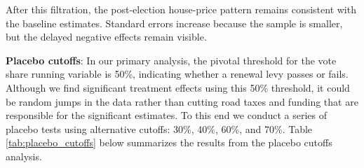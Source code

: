 After this filtration, the post-election house-price pattern remains consistent with the baseline estimates. Standard errors increase because the sample is smaller, but the delayed negative effects remain visible.

\textbf{Placebo cutoffs}: In our primary analysis, the pivotal threshold for the vote share running variable is 50\%, indicating whether a renewal levy passes or fails.  Although we find significant treatment effects using this 50\% threshold, it could be random jumps in the data rather than cutting road taxes and funding that are responsible for the significant estimates.  To this end we conduct a series of placebo tests using alternative cutoffs: 30\%, 40\%, 60\%, and 70\%. Table \ref{tab:placebo_cutoffs} below summarizes the results from the placebo cutoffs analysis. 


